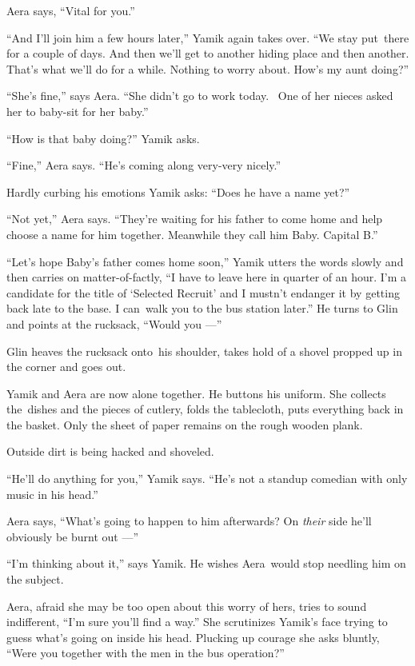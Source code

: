 \documentclass[twoside,11pt]{book}
\begin{document}
Aera says, ``Vital for you.''

``And I'll join him a few hours later,'' Yamik again takes over. ``We stay
put~there for a couple of days. And then we'll get to another hiding place and then another. That's what we'll do for a
while. Nothing to worry about. How's my aunt doing?''

``She's fine,'' says Aera. ``She didn't go to work today.~ One of her nieces
asked her to baby-sit for her baby.''

``How is that baby doing?'' Yamik asks.

``Fine,'' Aera says.  ``He's coming along very-very nicely.''

Hardly curbing his emotions Yamik asks: ``Does he have a name yet?''

``Not yet,'' Aera says. ``They're waiting for his father to come home and help
choose a name for him together. Meanwhile{ }they call him Baby. Capital
B.''

``Let's hope Baby's father comes home soon,'' Yamik utters the words slowly and
then carries on matter-of-factly, ``I have to leave here in quarter of an hour. I'm a candidate for
the title of `Selected Recruit' and I mustn't endanger it by getting back late to the base. I can~walk you to the
bus station later.'' He turns to Glin and points at the rucksack, ``Would you
---''

Glin heaves the rucksack onto~his shoulder, takes hold of a shovel{ }propped up
in the corner and goes out.

Yamik and Aera are now alone together. He buttons his uniform. She collects the~dishes and the pieces of cutlery, folds
the tablecloth, puts everything back in the basket. Only the sheet of paper remains on the rough wooden plank.

Outside dirt{ }is being hacked and shoveled.

``He'll do anything for you,'' Yamik says. ``He's not a standup comedian
with{ }only music in his head.''

Aera says, ``What's going to happen to him afterwards? On \textit{their} side he'll obviously be burnt out ---''

``I'm thinking about it,'' says Yamik. He wishes
Aera~would{ }stop needling him on the subject.

Aera, afraid she may be too open about this worry of hers, tries to sound indifferent, ``I'm sure you'll
find a way.'' She scrutinizes Yamik's face trying to guess what's going on inside his head.  Plucking up
courage she asks bluntly, ``Were you together with the men in the bus operation?''
\end{document}

